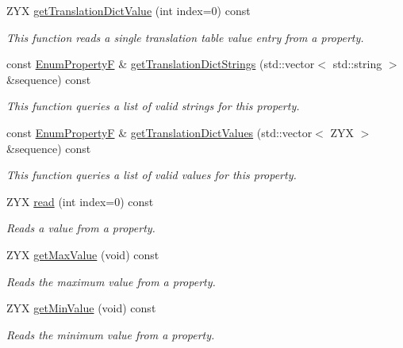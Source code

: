 \begin{DoxyCompactItemize}
Z\+Y\+X \hyperlink{classmv_i_m_p_a_c_t_1_1acquire_1_1_enum_property_f_a2f112c022daf12eb6c216cbba0686911}{get\+Translation\+Dict\+Value} (int index=0) const 
\begin{DoxyCompactList}\small\item\em This function reads a single translation table value entry from a property. \end{DoxyCompactList}\item 
const \hyperlink{classmv_i_m_p_a_c_t_1_1acquire_1_1_enum_property_f}{Enum\+Property\+F} \& \hyperlink{classmv_i_m_p_a_c_t_1_1acquire_1_1_enum_property_f_ac7a2fc239bc7ac7b8ae2872f8a34a32f}{get\+Translation\+Dict\+Strings} (std\+::vector$<$ std\+::string $>$ \&sequence) const 
\begin{DoxyCompactList}\small\item\em This function queries a list of valid strings for this property. \end{DoxyCompactList}\item 
const \hyperlink{classmv_i_m_p_a_c_t_1_1acquire_1_1_enum_property_f}{Enum\+Property\+F} \& \hyperlink{classmv_i_m_p_a_c_t_1_1acquire_1_1_enum_property_f_a9ed5e10a63d35c71b3050d92d1f20b64}{get\+Translation\+Dict\+Values} (std\+::vector$<$ Z\+Y\+X $>$ \&sequence) const 
\begin{DoxyCompactList}\small\item\em This function queries a list of valid values for this property. \end{DoxyCompactList}\item 
Z\+Y\+X \hyperlink{classmv_i_m_p_a_c_t_1_1acquire_1_1_enum_property_f_a05816804ecc94c93353cc0c60e2fa6aa}{read} (int index=0) const 
\begin{DoxyCompactList}\small\item\em Reads a value from a property. \end{DoxyCompactList}\item 
Z\+Y\+X \hyperlink{classmv_i_m_p_a_c_t_1_1acquire_1_1_enum_property_f_aa2ac695b80768a70c297ecc116d6ac3d}{get\+Max\+Value} (void) const 
\begin{DoxyCompactList}\small\item\em Reads the maximum value from a property. \end{DoxyCompactList}\item 
Z\+Y\+X \hyperlink{classmv_i_m_p_a_c_t_1_1acquire_1_1_enum_property_f_a2f6aea14a59af071d90dfeb714b3c8e9}{get\+Min\+Value} (void) const 
\begin{DoxyCompactList}\small\item\em Reads the minimum value from a property. \end{DoxyCompactList}\item 

\end{DoxyCompactItemize}
